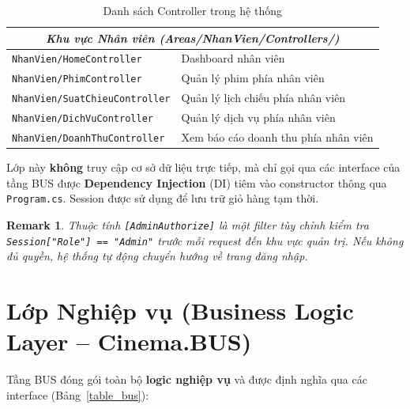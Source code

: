 \documentclass[12pt,a4paper,oneside]{book}
\theoremstyle{plain}
\newtheorem{rem}[thm]{Remark}
\numberwithin{equation}{chapter}
\begin{document}
\begin{table}[H]
\begin{center}
\begin{tabular}{|l|l|}
            \hline
            \multicolumn{2}{|c|}{\textit{Khu vực Nhân viên (Areas/NhanVien/Controllers/)}} \\
            \hline
            \texttt{NhanVien/HomeController}     & Dashboard nhân viên \\
            \hline
            \texttt{NhanVien/PhimController}     & Quản lý phim phía nhân viên \\
            \hline
            \texttt{NhanVien/SuatChieuController} & Quản lý lịch chiếu phía nhân viên \\
            \hline
            \texttt{NhanVien/DichVuController}   & Quản lý dịch vụ phía nhân viên \\
            \hline
            \texttt{NhanVien/DoanhThuController} & Xem báo cáo doanh thu phía nhân viên \\
            \hline
        \end{tabular}
    \end{center}
    \caption{Danh sách Controller trong hệ thống}\label{table_controller}
\end{table}

\noindent Lớp này \textbf{không} truy cập cơ sở dữ liệu trực tiếp, mà chỉ gọi qua các interface của tầng BUS được \textbf{Dependency Injection} (DI) tiêm vào constructor thông qua \texttt{Program.cs}. Session được sử dụng để lưu trữ giỏ hàng tạm thời.

\begin{rem}
    Thuộc tính \texttt{[AdminAuthorize]} là một filter tùy chỉnh kiểm tra \texttt{Session["Role"] == "Admin"} trước mỗi request đến khu vực quản trị. Nếu không đủ quyền, hệ thống tự động chuyển hướng về trang đăng nhập.
\end{rem}

\section{Lớp Nghiệp vụ (Business Logic Layer -- Cinema.BUS)}\label{Sec3.2}

\noindent Tầng BUS đóng gói toàn bộ \textbf{logic nghiệp vụ} và được định nghĩa qua các interface (Bảng~\ref{table_bus}):
\end{document}
